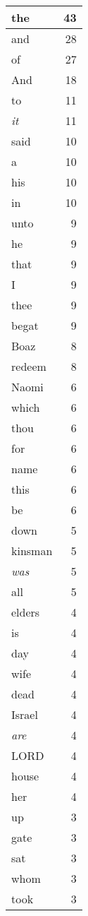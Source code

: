 \begin{center}
\begin{longtable}{l|r}
\hline \hline
\endlastfoot
the & 43 \\ \hline
and & 28 \\ \hline
of & 27 \\ \hline
And & 18 \\ \hline
to & 11 \\ \hline
\emph{it} & 11 \\ \hline
said & 10 \\ \hline
a & 10 \\ \hline
his & 10 \\ \hline
in & 10 \\ \hline
unto & 9 \\ \hline
he & 9 \\ \hline
that & 9 \\ \hline
I & 9 \\ \hline
thee & 9 \\ \hline
begat & 9 \\ \hline
Boaz & 8 \\ \hline
redeem & 8 \\ \hline
Naomi & 6 \\ \hline
which & 6 \\ \hline
thou & 6 \\ \hline
for & 6 \\ \hline
name & 6 \\ \hline
this & 6 \\ \hline
be & 6 \\ \hline
down & 5 \\ \hline
kinsman & 5 \\ \hline
\emph{was} & 5 \\ \hline
all & 5 \\ \hline
elders & 4 \\ \hline
is & 4 \\ \hline
day & 4 \\ \hline
wife & 4 \\ \hline
dead & 4 \\ \hline
Israel & 4 \\ \hline
\emph{are} & 4 \\ \hline
LORD & 4 \\ \hline
house & 4 \\ \hline
her & 4 \\ \hline
up & 3 \\ \hline
gate & 3 \\ \hline
sat & 3 \\ \hline
whom & 3 \\ \hline
took & 3 \\ \hline

\end{longtable}
\end{center}
